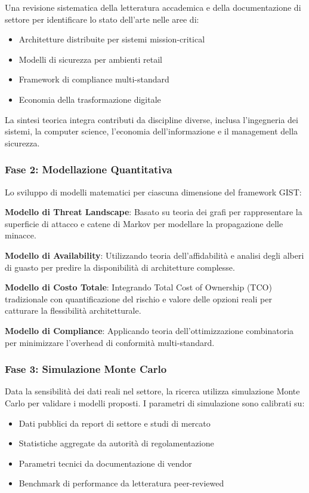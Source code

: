 Una revisione sistematica della letteratura accademica e della documentazione di settore per identificare lo stato dell'arte nelle aree di:
\begin{itemize}
\item Architetture distribuite per sistemi mission-critical
\item Modelli di sicurezza per ambienti retail
\item Framework di compliance multi-standard
\item Economia della trasformazione digitale
\end{itemize}

La sintesi teorica integra contributi da discipline diverse, inclusa l'ingegneria dei sistemi, la computer science, l'economia dell'informazione e il management della sicurezza.

\subsubsection{Fase 2: Modellazione Quantitativa}

Lo sviluppo di modelli matematici per ciascuna dimensione del framework GIST:

\textbf{Modello di Threat Landscape}: Basato su teoria dei grafi per rappresentare la superficie di attacco e catene di Markov per modellare la propagazione delle minacce.

\textbf{Modello di Availability}: Utilizzando teoria dell'affidabilità e analisi degli alberi di guasto per predire la disponibilità di architetture complesse.

\textbf{Modello di Costo Totale}: Integrando Total Cost of Ownership (TCO) tradizionale con quantificazione del rischio e valore delle opzioni reali per catturare la flessibilità architetturale.

\textbf{Modello di Compliance}: Applicando teoria dell'ottimizzazione combinatoria per minimizzare l'overhead di conformità multi-standard.

\subsubsection{Fase 3: Simulazione Monte Carlo}

Data la sensibilità dei dati reali nel settore, la ricerca utilizza simulazione Monte Carlo per validare i modelli proposti. I parametri di simulazione sono calibrati su:
\begin{itemize}
\item Dati pubblici da report di settore e studi di mercato
\item Statistiche aggregate da autorità di regolamentazione
\item Parametri tecnici da documentazione di vendor
\item Benchmark di performance da letteratura peer-reviewed
\end{itemize}

